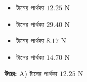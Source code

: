 \documentclass[12pt, a4paper]{article}
\begin{document}
\begin{itemize}[label={}, leftmargin=1cm, itemsep=0.5em]
    \item[\textbf{A)}] টানের পার্থক্য $12.25\text{ N}$
    \item[\textbf{B)}] টানের পার্থক্য $29.40\text{ N}$
    \item[\textbf{C)}] টানের পার্থক্য $8.17\text{ N}$
    \item[\textbf{D)}] টানের পার্থক্য $14.70\text{ N}$
\end{itemize}

\vspace{0.5em}
\begin{tcolorbox}[answerbox]
    \textbf{\color{success} উত্তর:} A) টানের পার্থক্য $12.25\text{ N}$
\end{tcolorbox}
\vspace{1em}
\end{document}

